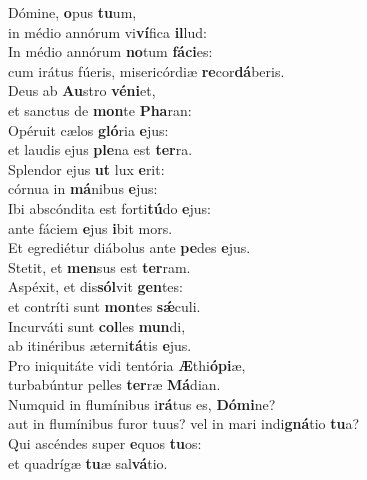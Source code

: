 \evenverse Dómine, \textbf{o}pus \textbf{tu}um,~\*\\
\evenverse in médio annórum vi\textbf{ví}fica \textbf{il}lud:\\
\oddverse In médio annórum \textbf{no}tum \textbf{fá}\textbf{ci}es:~\*\\
\oddverse cum irátus fúeris, misericórdiæ \textbf{re}cor\textbf{dá}beris.\\
\evenverse Deus ab \textbf{Au}stro \textbf{vé}\textbf{ni}et,~\*\\
\evenverse et sanctus de \textbf{mon}te \textbf{Pha}ran:\\
\oddverse Opéruit cælos \textbf{gló}ria \textbf{e}jus:~\*\\
\oddverse et laudis ejus \textbf{ple}na est \textbf{ter}ra.\\
\evenverse Splendor ejus \textbf{ut} lux \textbf{e}rit:~\*\\
\evenverse córnua in \textbf{má}nibus \textbf{e}jus:\\
\oddverse Ibi abscóndita est forti\textbf{tú}do \textbf{e}jus:~\*\\
\oddverse ante fáciem \textbf{e}jus \textbf{i}bit mors.\\
\evenverse Et egrediétur diábolus ante \textbf{pe}des \textbf{e}jus.~\*\\
\evenverse Stetit, et \textbf{men}sus est \textbf{ter}ram.\\
\oddverse Aspéxit, et dis\textbf{sól}vit \textbf{gen}tes:~\*\\
\oddverse et contríti sunt \textbf{mon}tes \textbf{sǽ}culi.\\
\evenverse Incurváti sunt \textbf{col}les \textbf{mun}di,~\*\\
\evenverse ab itinéribus æterni\textbf{tá}tis \textbf{e}jus.\\
\oddverse Pro iniquitáte vidi tentória \textbf{Æ}thi\textbf{ó}\textbf{pi}æ,~\*\\
\oddverse turbabúntur pelles \textbf{ter}ræ \textbf{Má}dian.\\
\evenverse Numquid in flumínibus i\textbf{rá}tus es, \textbf{Dó}\textbf{mi}ne?~\*\\
\evenverse aut in flumínibus furor tuus? vel in mari indi\textbf{gná}tio \textbf{tu}a?\\
\oddverse Qui ascéndes super \textbf{e}quos \textbf{tu}os:~\*\\
\oddverse et quadrígæ \textbf{tu}æ sal\textbf{vá}tio.\\
